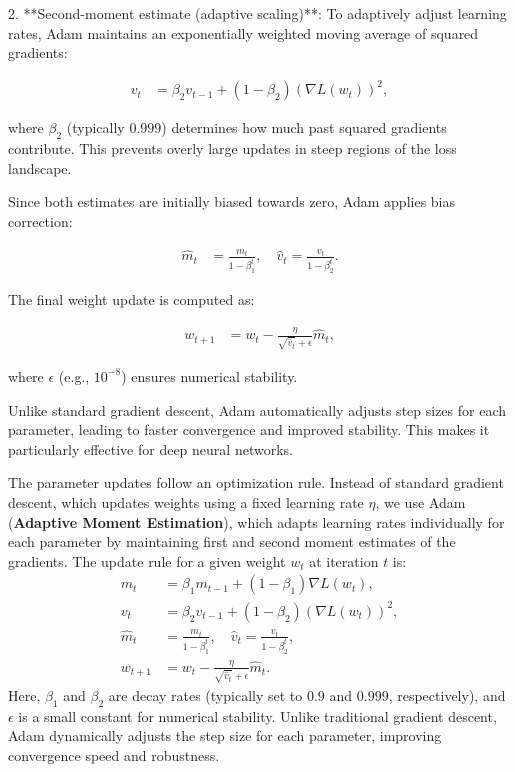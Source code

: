 2. **Second-moment estimate (adaptive scaling)**:  
   To adaptively adjust learning rates, Adam maintains an exponentially weighted moving average of squared gradients:  

   \begin{align}  
       v_t &= \beta_2 v_{t-1} + (1 - \beta_2) (\nabla L(w_t))^2,  
   \end{align}  

   where \( \beta_2 \) (typically \( 0.999 \)) determines how much past squared gradients contribute.  
   This prevents overly large updates in steep regions of the loss landscape.  

Since both estimates are initially biased towards zero, Adam applies bias correction:  

\begin{align}  
    \hat{m}_t &= \frac{m_t}{1 - \beta_1^t}, \quad  
    \hat{v}_t = \frac{v_t}{1 - \beta_2^t}.  
\end{align}  

The final weight update is computed as:  

\begin{align}  
    w_{t+1} &= w_t - \frac{\eta}{\sqrt{\hat{v}_t} + \epsilon} \hat{m}_t,  
\end{align}  

where \( \epsilon \) (e.g., \( 10^{-8} \)) ensures numerical stability.  

Unlike standard gradient descent, Adam automatically adjusts step sizes for each parameter,  
leading to faster convergence and improved stability. This makes it particularly effective for deep neural networks.  


The parameter updates follow an optimization rule. Instead of standard gradient descent, which updates weights using a fixed learning rate \( \eta \), we use Adam (\textbf{Adaptive Moment Estimation}),
which adapts learning rates individually for each parameter by maintaining first and second moment estimates of the gradients. The update rule for a given weight \( w_t \) at iteration \( t \) is:  
\begin{align}  
    m_t &= \beta_1 m_{t-1} + (1 - \beta_1) \nabla L(w_t),  \\  
    v_t &= \beta_2 v_{t-1} + (1 - \beta_2) (\nabla L(w_t))^2,  \\  
    \hat{m}_t &= \frac{m_t}{1 - \beta_1^t}, \quad  
    \hat{v}_t = \frac{v_t}{1 - \beta_2^t},  \\  
    w_{t+1} &= w_t - \frac{\eta}{\sqrt{\hat{v}_t} + \epsilon} \hat{m}_t.  
\end{align}  
Here, \( \beta_1 \) and \( \beta_2 \) are decay rates (typically set to \( 0.9 \) and \( 0.999 \), respectively), and \( \epsilon \) is a small constant for numerical stability.
Unlike traditional gradient descent, Adam dynamically adjusts the step size for each parameter, improving convergence speed and robustness.  

